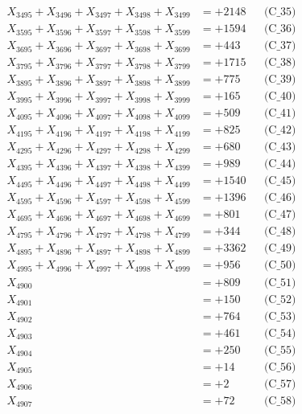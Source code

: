 \documentclass[a4paper,10pt]{article}
\begin{document}
{\begin{align}
X_{3495} + X_{3496} + X_{3497} + X_{3498} + X_{3499} &= +2148 && \text{(C\_35)} \\
\allowbreak
X_{3595} + X_{3596} + X_{3597} + X_{3598} + X_{3599} &= +1594 && \text{(C\_36)} \\
X_{3695} + X_{3696} + X_{3697} + X_{3698} + X_{3699} &= +443 && \text{(C\_37)} \\
X_{3795} + X_{3796} + X_{3797} + X_{3798} + X_{3799} &= +1715 && \text{(C\_38)} \\
X_{3895} + X_{3896} + X_{3897} + X_{3898} + X_{3899} &= +775 && \text{(C\_39)} \\
X_{3995} + X_{3996} + X_{3997} + X_{3998} + X_{3999} &= +165 && \text{(C\_40)} \\
\allowbreak
X_{4095} + X_{4096} + X_{4097} + X_{4098} + X_{4099} &= +509 && \text{(C\_41)} \\
X_{4195} + X_{4196} + X_{4197} + X_{4198} + X_{4199} &= +825 && \text{(C\_42)} \\
X_{4295} + X_{4296} + X_{4297} + X_{4298} + X_{4299} &= +680 && \text{(C\_43)} \\
X_{4395} + X_{4396} + X_{4397} + X_{4398} + X_{4399} &= +989 && \text{(C\_44)} \\
X_{4495} + X_{4496} + X_{4497} + X_{4498} + X_{4499} &= +1540 && \text{(C\_45)} \\
\allowbreak
X_{4595} + X_{4596} + X_{4597} + X_{4598} + X_{4599} &= +1396 && \text{(C\_46)} \\
X_{4695} + X_{4696} + X_{4697} + X_{4698} + X_{4699} &= +801 && \text{(C\_47)} \\
X_{4795} + X_{4796} + X_{4797} + X_{4798} + X_{4799} &= +344 && \text{(C\_48)} \\
X_{4895} + X_{4896} + X_{4897} + X_{4898} + X_{4899} &= +3362 && \text{(C\_49)} \\
X_{4995} + X_{4996} + X_{4997} + X_{4998} + X_{4999} &= +956 && \text{(C\_50)} \\
\allowbreak
X_{4900} &= +809 && \text{(C\_51)} \\
X_{4901} &= +150 && \text{(C\_52)} \\
X_{4902} &= +764 && \text{(C\_53)} \\
X_{4903} &= +461 && \text{(C\_54)} \\
X_{4904} &= +250 && \text{(C\_55)} \\
\allowbreak
X_{4905} &= +14 && \text{(C\_56)} \\
X_{4906} &= +2 && \text{(C\_57)} \\
X_{4907} &= +72 && \text{(C\_58)} \\

\end{align}}
\end{document}
